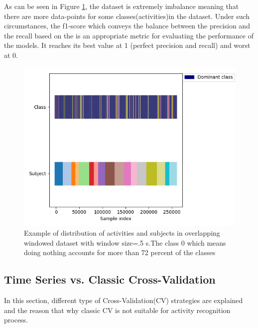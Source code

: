 As can be seen in Figure 
\ref{fig:class}, the dataset is extremely imbalance meaning that there 
are more data-points for some classes(activities)in the dataset. Under 
such circumstances, the f1-score which conveys the balance between the 
precision and the recall based on the {} is an appropriate metric for 
evaluating the performance of the models. It reaches its best value at 
1 (perfect precision and recall) and worst at 0.


\begin{figure}[h]
    \centering
    \includegraphics[width=.4\textwidth]{Figures/Class_subject.png}
    \caption{Example of distribution of activities and subjects in overlapping windowed dataset with window size=.5 s.The class 0 which means doing nothing accounts for more than 72 percent of the classes   }
    \label{fig:class}
\end{figure}

\subsection{Time Series  vs. Classic Cross-Validation}
In this section, different type of Cross-Validation(CV) strategies are 
explained and the reason that why classic CV is not suitable for 
activity recognition process.\newline

